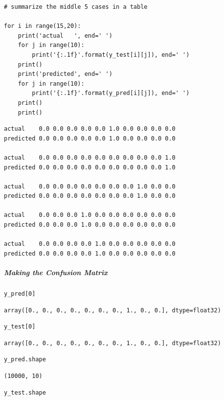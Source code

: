 \begin{verbatim}
# summarize the middle 5 cases in a table

for i in range(15,20):
    print('actual   ', end=' ')
    for j in range(10):
        print('{:.1f}'.format(y_test[i][j]), end=' ')
    print()
    print('predicted', end=' ')
    for j in range(10):
        print('{:.1f}'.format(y_pred[i][j]), end=' ')
    print()
    print()
\end{verbatim}

\begin{verbatim}
actual    0.0 0.0 0.0 0.0 0.0 1.0 0.0 0.0 0.0 0.0 
predicted 0.0 0.0 0.0 0.0 0.0 1.0 0.0 0.0 0.0 0.0 

actual    0.0 0.0 0.0 0.0 0.0 0.0 0.0 0.0 0.0 1.0 
predicted 0.0 0.0 0.0 0.0 0.0 0.0 0.0 0.0 0.0 1.0 

actual    0.0 0.0 0.0 0.0 0.0 0.0 0.0 1.0 0.0 0.0 
predicted 0.0 0.0 0.0 0.0 0.0 0.0 0.0 1.0 0.0 0.0 

actual    0.0 0.0 0.0 1.0 0.0 0.0 0.0 0.0 0.0 0.0 
predicted 0.0 0.0 0.0 1.0 0.0 0.0 0.0 0.0 0.0 0.0 

actual    0.0 0.0 0.0 0.0 1.0 0.0 0.0 0.0 0.0 0.0 
predicted 0.0 0.0 0.0 0.0 1.0 0.0 0.0 0.0 0.0 0.0
\end{verbatim}

\subparagraph{Making the Confusion Matrix}

\begin{verbatim}
y_pred[0]
\end{verbatim}

\begin{verbatim}
array([0., 0., 0., 0., 0., 0., 0., 1., 0., 0.], dtype=float32)
\end{verbatim}

\begin{verbatim}
y_test[0]
\end{verbatim}

\begin{verbatim}
array([0., 0., 0., 0., 0., 0., 0., 1., 0., 0.], dtype=float32)
\end{verbatim}

\begin{verbatim}
y_pred.shape
\end{verbatim}

\begin{verbatim}
(10000, 10)
\end{verbatim}

\begin{verbatim}
y_test.shape
\end{verbatim}


